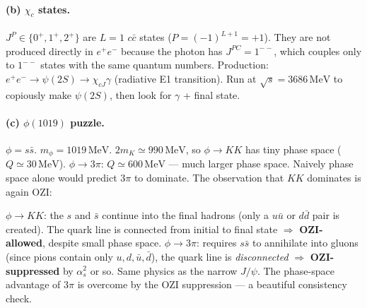 \documentclass[11pt]{article}
\newcommand{\MeV}{\,\mathrm{MeV}}
\begin{document}
\paragraph{(b) $\chi_c$ states.} $J^P\in\{0^+,1^+,2^+\}$ are $L=1$ $c\bar c$ states ($P=(-1)^{L+1}=+1$). They are not produced directly in $e^+e^-$ because the photon has $J^{PC}=1^{--}$, which couples only to $1^{--}$ states with the same quantum numbers. Production: $e^+e^-\to\psi(2S)\to\chi_{cJ}\gamma$ (radiative E1 transition). Run at $\sqrt{s}=3686\MeV$ to copiously make $\psi(2S)$, then look for $\gamma$ + final state.

\paragraph{(c) $\phi(1019)$ puzzle.} $\phi=s\bar s$. $m_\phi=1019\MeV$. $2m_K\simeq 990\MeV$, so $\phi\to KK$ has tiny phase space ($Q\simeq 30\MeV$). $\phi\to 3\pi$: $Q\simeq 600\MeV$ --- much larger phase space. Naively phase space alone would predict $3\pi$ to dominate. The observation that $KK$ dominates is again OZI:
\begin{center}
\end{center}
$\phi\to KK$: the $s$ and $\bar s$ continue into the final hadrons (only a $u\bar u$ or $d\bar d$ pair is created). The quark line is connected from initial to final state $\Rightarrow$ \textbf{OZI-allowed}, despite small phase space. $\phi\to 3\pi$: requires $s\bar s$ to annihilate into gluons (since pions contain only $u,d,\bar u,\bar d$), the quark line is \emph{disconnected} $\Rightarrow$ \textbf{OZI-suppressed} by $\alpha_s^{2}$ or so. Same physics as the narrow $J/\psi$. The phase-space advantage of $3\pi$ is overcome by the OZI suppression --- a beautiful consistency check.
\end{document}
